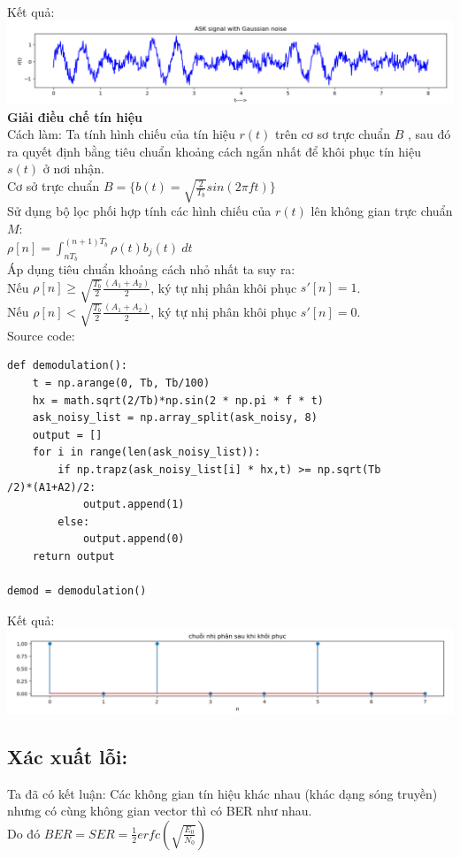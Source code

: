 Kết quả: \\
\includegraphics[width=\textwidth]{Img/ASK_N.png}
\textbf{Giải điều chế tín hiệu}\\
Cách làm: Ta tính hình chiếu của tín hiệu $r(t)$ trên cơ sơ trực chuẩn $B$ , sau đó ra quyết định bằng tiêu chuẩn khoảng cách ngắn nhất để khôi phục tín hiệu $s(t)$ ở nơi nhận. \\
Cơ sở trực chuẩn $B = \{b(t) = \sqrt{\frac{2}{T_{b}}}sin(2\pi ft)\}$\\
Sử dụng bộ lọc phối hợp tính các hình chiếu của $r(t)$ lên không gian trực chuẩn $M$:\\
$\rho[n] = \int_{nT_{b}}^{(n+1)T_{b}} \rho(t)b_{j}(t)\  dt $ \\
Áp dụng tiêu chuẩn khoảng cách nhỏ nhất ta suy ra:\\
Nếu $\rho[n] \geq \sqrt{\frac{T_{b}}{2}}\frac{(A_{1}+A_{2})}{2} $, ký tự nhị phân khôi phục $s'[n] = 1$.\\
Nếu $\rho[n] < \sqrt{\frac{T_{b}}{2}}\frac{(A_{1}+A_{2})}{2} $, ký tự nhị phân khôi phục $s'[n] = 0$.\\
Source code:
\begin{lstlisting}
def demodulation():
    t = np.arange(0, Tb, Tb/100)
    hx = math.sqrt(2/Tb)*np.sin(2 * np.pi * f * t)
    ask_noisy_list = np.array_split(ask_noisy, 8)
    output = []
    for i in range(len(ask_noisy_list)):
        if np.trapz(ask_noisy_list[i] * hx,t) >= np.sqrt(Tb
/2)*(A1+A2)/2:
            output.append(1)
        else:
            output.append(0)
    return output

demod = demodulation()
\end{lstlisting}
Kết quả: \\
\includegraphics[width=\textwidth]{Img/In_Signal.png}
\subsection{Xác xuất lỗi:}
Ta đã có kết luận: Các không gian tín hiệu khác nhau (khác dạng sóng truyền) nhưng có cùng không gian vector thì có BER như nhau.\\
Do đó $BER = SER = \frac{1}{2}erfc(\sqrt{\frac{E_{0}}{N_{0}}})$
